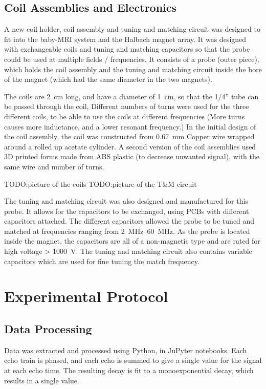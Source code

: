 \subsection{Coil Assemblies and Electronics}
A new coil holder, coil assembly and tuning and matching circuit was designed to fit into the baby-MRI system and the Halbach magnet array.
It was designed with exchangeable coils and tuning and matching capacitors so that the probe could be used at multiple fields / frequencies.
It consists of a probe (outer piece), which holds the coil assembly and the tuning and matching circuit inside the bore of the magnet (which had the same diameter in the two magnets).

The coils are \SI{2}{cm} long, and have a diameter of \SI{1}{cm}, so that the 1/4'' tube can be passed through the coil,
Different numbers of turns were used for the three different coils, to be able to use the coils at different frequencies (More turns causes more inductance, and a lower resonant frequency.)
In the initial design of the coil assembly, the coil was constructed from \SI{0.67}{mm} Copper wire wrapped around a rolled up acetate cylinder.
A second version of the coil assemblies used 3D printed forms made from ABS plastic (to decrease unwanted signal), with the same wire and number of turns.

TODO:picture of the coils
TODO:picture of the T\&M circuit

The tuning and matching circuit was also designed and manufactured for this probe.
It allows for the capacitors to be exchanged, using PCBs with different capacitors attached.
The different capacitors allowed the probe to be tuned and matched at frequencies ranging from \SIrange{2}{60}{\mega\hertz}.
As the probe is located inside the magnet, the capacitors are all of a non-magnetic type and are rated for high voltage > \SI{1000}{V}.
The tuning and matching circuit also contains variable capacitors which are used for fine tuning the match frequency.

\section{Experimental Protocol}


\subsection{Data Processing}
Data was extracted and processed using Python, in JuPyter notebooks.
Each echo train is phased, and each echo is summed to give a single value for the signal at each echo time.
The resulting decay is fit to a monoexponential decay, which results in a single \Ttwo value.




